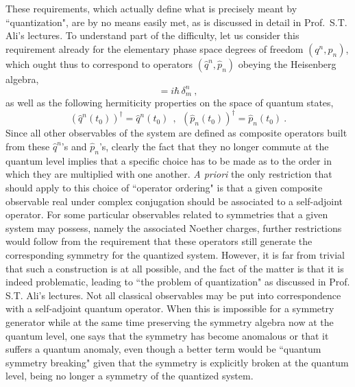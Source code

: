 \documentclass[a4paper,11pt]{article}
\begin{document}
These requirements, which actually define what is precisely
meant by ``quantization", are by no means easily met, as is discussed
in detail in Prof.~S.T. Ali's lectures. To understand part of the
difficulty, let us consider this requirement already for the
elementary phase space degrees of freedom $(q^n,p_n)$, which ought
thus to correspond to operators $(\hat{q}^n,\hat{p}_n)$ obeying the
Heisenberg algebra,
\begin{equation}[\,\hat{q}^n(t_0),\hat{p}_m(t_0)\,]=i\hbar\,\delta^n_m\ ,
\end{equation}
as well as the following hermiticity properties on the space of quantum states,
\begin{equation}
\left(\hat{q}^n(t_0)\right)^\dagger=\hat{q}^n(t_0)\ \ ,\ \ 
\left(\hat{p}_n(t_0)\right)^\dagger=\hat{p}_n(t_0)\ .
\end{equation}
Since all other observables of the system are defined as
composite operators built from these $\hat{q}^n$'s and $\hat{p}_n$'s,
clearly the fact that they no longer commute at the quantum level
implies that a specific choice has to be made as to the order in which
they are multiplied with one another. {\sl A priori\/} the only restriction
that should apply to this choice of ``operator ordering" is that a given
composite observable real under complex conjugation
should be associated to a self-adjoint operator. For some
particular observables related to symmetries that a given system may
possess, namely the associated Noether charges,
further restrictions would follow from the requirement that
these operators still generate the corresponding symmetry for the
quantized system. However, it is far from trivial that such a construction
is at all possible, and the fact of the matter is that it is indeed
problematic, leading to ``the problem of quantization" as discussed
in Prof. S.T. Ali's lectures. Not all classical observables may be
put into correspondence with a self-adjoint quantum operator.
When this is impossible for a symmetry generator while at the same time
preserving the symmetry algebra now at the quantum level, one says that 
the symmetry has become anomalous or that it suffers a quantum anomaly, 
even though a better term would be ``quantum symmetry breaking" given that 
the symmetry is explicitly broken at the quantum level, being no longer 
a symmetry of the quantized system. 
\end{document}
